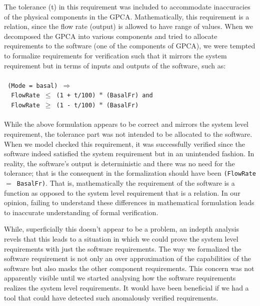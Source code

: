 The tolerance (t) in this requirement was included to accommodate inaccuracies of the physical components in the GPCA. Mathematically, this requirement is a relation, since the flow rate (output) is allowed to have range of values. When we decomposed the GPCA into various components and tried to allocate requirements to the software (one of the components of GPCA), we were tempted to formalize requirements for verification such that it mirrors the system requirement but in terms of inputs and outputs of the software, such as:
\\\\
\footnotesize{\texttt{
(Mode = basal) $\Rightarrow$\\
\textcolor{white}{------}FlowRate $\leq$ (1 + t/100) $\ast$ (BasalFr) and \\
\textcolor{white}{------}FlowRate $\geq$ (1 - t/100) $\ast$ (BasalFr)\\
}}
\normalsize{}\\
While the above formulation appears to be correct and mirrors the system level requirement, the tolerance part was not intended to be allocated to the software. When we model checked this requirement, it was successfully verified since the software indeed satisfied the system requirement but in an unintended fashion. In reality, the software's output is deterministic and there was no need for the tolerance; that is the consequent in the formalization should have been \texttt{(FlowRate $=$ BasalFr)}. That is, mathematically the requirement of the software is a function as opposed to the system level requirement that is a relation. In our opinion, failing to understand these differences in mathematical formulation leads to inaccurate understanding of formal verification.

While, superficially this doesn't appear to be a problem, an indepth analysis revels that this leads to a situation in which we could prove the system level requirements with just the software requirements. The way we formalized the software requirement is not only an over approximation of the capabilities of the software but also masks the other component requirements. This concern was not apparently visible until we started analysing how the software requirements realizes the system level requirements. It would have been beneficial if we had a tool that could have detected such anomalously verified requirements. 
